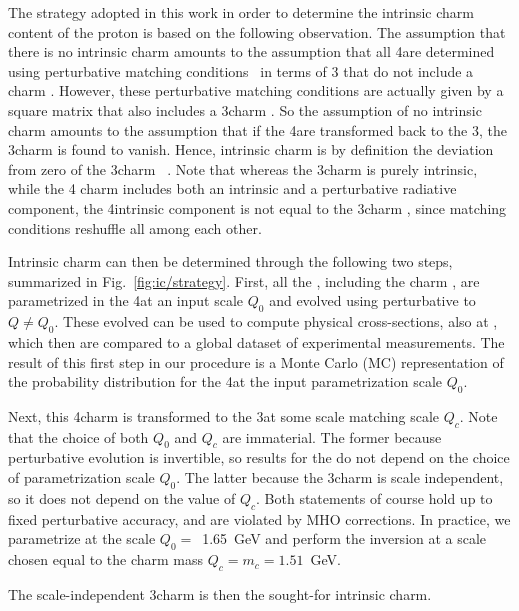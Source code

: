 
The strategy adopted in this work in order to
determine the intrinsic charm content of the proton is 
based on the following
observation.
%
The assumption that there is no intrinsic charm
amounts to the assumption
that all 4\fns \pdfs are determined~\cite{Collins:1986mp} using
perturbative matching conditions~\cite{pdfnnlo} in terms of 
3\fns \pdfs
that do not include
a charm \pdf.
%
However, these perturbative matching conditions are
actually given by a square matrix that also includes a 3\fns charm
\pdf.
%
So the assumption of no intrinsic charm amounts to the assumption
that if the 4\fns \pdfs are transformed back to the 3\fns, the 3\fns charm
\pdf is found to vanish. Hence, intrinsic charm is by definition the
deviation from zero of the 3\fns charm \pdf~\cite{Ball:2015dpa}. Note
that whereas the 3\fns charm \pdf is purely intrinsic, while the 4\fns
charm \pdf includes both an intrinsic and a perturbative
 radiative component, the
4\fns intrinsic component is not equal to the 3\fns charm \pdf, since
matching conditions reshuffle all \pdfs among each other. 

Intrinsic charm can then be determined through the following two steps,
summarized in Fig.~\ref{fig:ic/strategy}. 
First, all the \pdfs, including the charm \pdf, are parametrized 
in the 4\fns at an input scale $Q_0$ and evolved 
using \nnlo perturbative \qcd to   $Q \not = Q_0$.
%
These evolved \pdfs can be used to 
compute physical cross-sections, also at \nnlo, which then are
compared to a global dataset of experimental measurements.
%
The result of this first step in our procedure is 
a Monte Carlo (MC) representation
of the probability distribution for the 4\fns \pdfs at the input
parametrization scale $Q_0$.

Next, this 4\fns charm \pdf is transformed to the 3\fns at some scale matching scale
$Q_c$.
%
Note that the choice of both $Q_0$ and $Q_c$ are immaterial. The former
because perturbative evolution is invertible, so
results for the \pdfs do not depend on the choice of
parametrization scale $Q_0$. The latter because 
the 3\fns charm is scale independent, so it does not depend on the
value of $Q_c$.
Both statements of course hold up to fixed perturbative accuracy, and
are violated by MHO corrections.
%
In practice, we parametrize \pdfs at the scale
$Q_0=$~1.65~GeV and perform the inversion at a scale
chosen equal to the charm mass $Q_c=m_c=1.51$~GeV.

The scale-independent 3\fns charm \pdf is then the sought-for intrinsic
charm.

